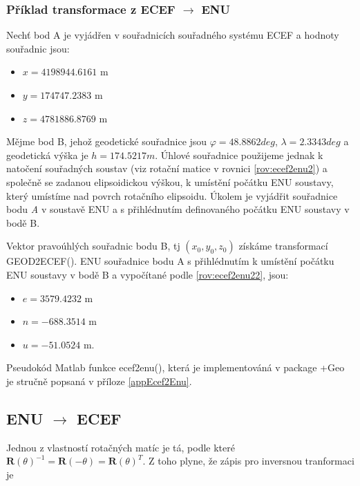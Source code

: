 \documentclass[11pt,a4paper]{article}
\begin{document}
\subsubsection{Příklad transformace z ECEF $\rightarrow$ ENU}

Nechť bod A je vyjádřen v souřadnicích souřadného systému ECEF a hodnoty souřadnic jsou:
\begin{itemize}
\item $x = 4198944.6161$ m
\item $y = 174747.2383$ m
\item $z = 4781886.8769$ m
\end{itemize}

Mějme bod B, jehož geodetické souřadnice jsou $ \varphi = 48.8862 deg$, $\lambda = 2.3343 deg$ a geodetická výška je $ h = 174.5217 m $. Úhlové souřadnice použijeme jednak k natočení souřadných soustav (viz rotační matice v rovnici \ref{rov:ecef2enu2}) a společně se zadanou elipsoidickou výškou, k umístění počátku ENU soustavy, který umístíme nad povrch rotačního elipsoidu. Úkolem je vyjádřit souřadnice bodu \textit{A} v soustavě ENU a s přihlédnutím definovaného počátku ENU soustavy v bodě B.

Vektor pravoúhlých souřadnic bodu B, tj $ \left(x_{0}, y_{0}, z_{0} \right)$ získáme transformací GEOD2ECEF(). ENU souřadnice bodu A s přihlédnutím k umístění počátku ENU soustavy v bodě B a vypočítané podle \ref{rov:ecef2enu22}, jsou:
\begin{itemize}
\item $e = 3579.4232 $ m
\item $n = -688.3514 $ m
\item $u = -51.0524 $ m.
\end{itemize}

Pseudokód Matlab funkce ecef2enu(), která je implementováná v package +Geo je stručně popsaná v příloze \ref{appEcef2Enu}.


\subsection{ENU $\rightarrow$ ECEF}


Jednou z vlastností rotačných matíc je tá, podle které $\mathbf{R}\left(\theta\right)^{-1} = \mathbf{R}\left(-\theta\right) = \mathbf{R}\left(\theta\right)^{T}$. Z toho plyne, že zápis pro inversnou tranformaci je
\end{document}
